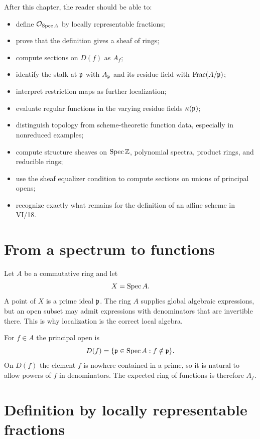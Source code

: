 After this chapter, the reader should be able to:
\begin{itemize}
\item define $\mathcal O_{\operatorname{Spec} A}$ by locally representable fractions;
\item prove that the definition gives a sheaf of rings;
\item compute sections on $D(f)$ as $A_f$;
\item identify the stalk at $\mathfrak p$ with $A_{\mathfrak p}$ and its residue field with
$\operatorname{Frac}(A/\mathfrak p)$;
\item interpret restriction maps as further localization;
\item evaluate regular functions in the varying residue fields $\kappa(\mathfrak p)$;
\item distinguish topology from scheme-theoretic function data, especially in nonreduced
examples;
\item compute structure sheaves on $\operatorname{Spec}\mathbb Z$, polynomial spectra, product rings, and
reducible rings;
\item use the sheaf equalizer condition to compute sections on unions of principal opens;
\item recognize exactly what remains for the definition of an affine scheme in VI/18.
\end{itemize}



\section{From a spectrum to functions}

Let $A$ be a commutative ring and let
\[
X=\operatorname{Spec} A.
\]
A point of $X$ is a prime ideal $\mathfrak p$.  The ring $A$ supplies global algebraic
expressions, but an open subset may admit expressions with denominators that are invertible
there.  This is why localization is the correct local algebra.

For $f\in A$ the principal open is
\[
D(f)=\{\mathfrak p\in\operatorname{Spec} A:f\notin\mathfrak p\}.
\]
On $D(f)$ the element $f$ is nowhere contained in a prime, so it is natural to allow
powers of $f$ in denominators.  The expected ring of functions is therefore $A_f$.



\section{Definition by locally representable fractions}

